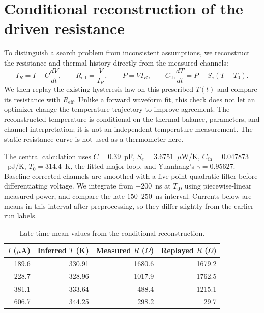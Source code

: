 \documentclass[11pt]{article}
\begin{document}
\clearpage
\clearpage
\section{Conditional reconstruction of the driven resistance}
\label{sec:inverse_hysteresis}

To distinguish a search problem from inconsistent assumptions, we reconstruct the
resistance and thermal history directly from the measured channels:
\begin{equation}
I_R=I-C\frac{dV}{dt},\qquad R_{\mathrm{eff}}=\frac{V}{I_R},\qquad
P=VI_R,\qquad C_{\mathrm{th}}\frac{dT}{dt}=P-S_e(T-T_0).
\end{equation}
We then replay the existing hysteresis law on this prescribed $T(t)$ and compare
its resistance with $R_{\mathrm{eff}}$. Unlike a forward waveform fit, this check
does not let an optimizer change the temperature trajectory to improve agreement.
The reconstructed temperature is conditional on the thermal balance, parameters,
and channel interpretation; it is not an independent temperature measurement.
The static resistance curve is not used as a thermometer here.

The central calculation uses $C=0.39$~pF, $S_e=3.6751$~$\mu$W/K,
$C_{\mathrm{th}}=0.047873$~pJ/K, $T_0=314.4$~K, the fitted major loop,
and Yuanhang's $\gamma=0.95627$. Baseline-corrected channels are smoothed with a
five-point quadratic filter before differentiating voltage. We integrate from
$-200$~ns at $T_0$, using piecewise-linear measured power, and compare the late
$150$--$250$~ns interval. Currents below are means in this interval after
preprocessing, so they differ slightly from the earlier run labels.

\begin{table}[H]
\centering
\caption{Late-time mean values from the conditional reconstruction.}
\label{tab:inverse_hysteresis}
\begin{tabular}{rrrr}
\toprule
$I$ ($\mu$A) & Inferred $T$ (K) & Measured $R$ ($\Omega$) & Replayed $R$ ($\Omega$) \\
\midrule
189.6 & 330.91 & 1680.6 & 1679.2 \\
228.7 & 328.96 & 1017.9 & 1762.5 \\
381.1 & 333.64 & 488.4 & 1215.1 \\
606.7 & 344.25 & 298.2 & 29.7 \\
\bottomrule
\end{tabular}
\end{table}
\end{document}
